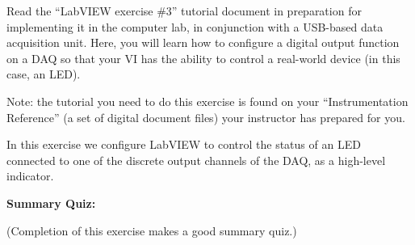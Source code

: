 

Read the ``LabVIEW exercise \#3'' tutorial document in preparation for implementing it in the computer lab, in conjunction with a USB-based data acquisition unit.  Here, you will learn how to configure a digital output function on a DAQ so that your VI has the ability to control a real-world device (in this case, an LED).

\vskip 10pt

Note: the tutorial you need to do this exercise is found on your ``Instrumentation Reference'' (a set of digital document files) your instructor has prepared for you.














In this exercise we configure LabVIEW to control the status of an LED connected to one of the discrete output channels of the DAQ, as a high-level indicator.












\vfil \eject

\noindent
{\bf Summary Quiz:}

(Completion of this exercise makes a good summary quiz.)



